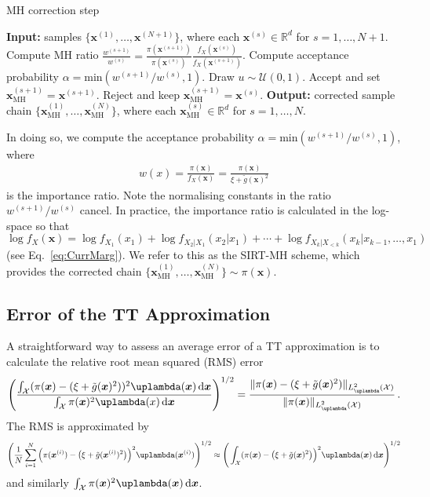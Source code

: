 \begin{algorithm}[!ht]
	\caption{MH correction step}
	\begin{algorithmic}[1]
		\STATE \textbf{Input:} samples $\{ \bm{x}^{(1)},\dots, \bm{x}^{(N+1)} \} $, where each $\bm{x}^{(s)} \in \mathbb{R}^d$ for $s = 1, \dots, N+1$.
		\STATE Compute MH ratio $\frac{w^{(s+1)}}{w^{(s)} } =\frac{\pi(\bm{x}^{(s+1)})}{\pi(\bm{x}^{(s)})} \frac{f_X(\bm{x}^{(s)})}{f_X(\bm{x}^{(s+1)})}$.
		\STATE Compute acceptance probability $\alpha = \text{min}(w^{(s+1)}/w^{(s)}, 1)$. 
		\STATE Draw $u \sim \mathcal{U}(0,1)$.
		\STATE Accept and set $\bm{x}_{\text{MH}}^{(s+1)} = \bm{x}^{(s+1)}$.
		\ELSE  
		\STATE Reject and keep $\bm{x}_{\text{MH}}^{(s+1)} = \bm{x}^{(s)}$.
		\ENDIF
		\ENDFOR
		\STATE \textbf{Output:} corrected sample chain $\{ \bm{x}_{\text{MH}}^{(1)},\dots, \bm{x}_{\text{MH}}^{(N)} \} $, where each $\bm{x}_{\text{MH}}^{(s)} \in \mathbb{R}^d$ for $s = 1, \dots, N$.
	\end{algorithmic}
	\label{alg:MHCorr}
\end{algorithm}
In doing so, we compute the acceptance probability $  \alpha = \text{min}(w^{(s+1)}/w^{(s)}, 1)$, where 
\begin{align}
	w(x) = \frac{\pi(\bm{x})}{f_X(\bm{x})} = \frac{\pi(\bm{x})}{\xi + \tilde{g}(\bm{x})^2} 
\end{align}
is the importance ratio.
Note the normalising constants in the ratio $w^{(s+1)}/w^{(s)}$ cancel.
In practice, the importance ratio is calculated in the log-space so that $\log f_X(\bm{x})  =  \log f_{X_1}(x_1) + \log f_{X_2|X_1}(x_2|x_1) + \cdots + \log f_{X_k|X_{<k}}(x_k|x_{k-1},\dots,x_1)$ (see Eq.~\ref{eq:CurrMarg}).
We refer to this as the SIRT-MH scheme, which provides the corrected chain $\{\bm{x}_{\text{MH}}^{(1)},\dots,\bm{x}_{\text{MH}}^{(N)}\}\sim\pi(\bm{x})$.


\subsection{Error of the TT Approximation}
A straightforward way to assess an average error of a TT approximation is to calculate the relative root mean squared (RMS) error 
\begin{align}
	\Bigg( \frac{ \int_{\mathcal{X}} (\pi(\bm{x}) - (\xi + \tilde{g}(\bm{x})^2))^2 \uplambda(\bm{x}) \diff \bm{x}}{ \int_{\mathcal{X}} \pi(\bm{x})^2 \uplambda(x)  \diff \bm{x} } \Bigg)^{1/2} =	\frac{\lVert 	\pi(\bm{x}) - (\xi + \tilde{g}(\bm{x})^2)  \rVert_{L^2_{\uplambda}(\mathcal{X})}}{\lVert 	\pi(\bm{x}) \rVert_{L^2_{\uplambda}(\mathcal{X})}  } \, .
\end{align}
The RMS is approximated by
\begin{align}
	\Bigg( \frac{1}{N} \sum^{N}_{i =1} \Big(\pi(\bm{x}^{(i)}) - \big(\xi + \tilde{g}(\bm{x}^{(i)})^2\big)\Big)^2 \uplambda(\bm{x}^{(i)})\Bigg)^{1/2}    \approx \Bigg(  \int_{\mathcal{X}} (\pi(\bm{x}) - \big(\xi + \tilde{g}(\bm{x})^2\big)\Big)^2 \uplambda(\bm{x}) \diff \bm{x} \Bigg)^{1/2} \label{eq:RMSTT}
\end{align}
and similarly $\int_{\mathcal{X}} \pi(\bm{x})^2 \uplambda(\bm{x})  \diff \bm{x}$.


